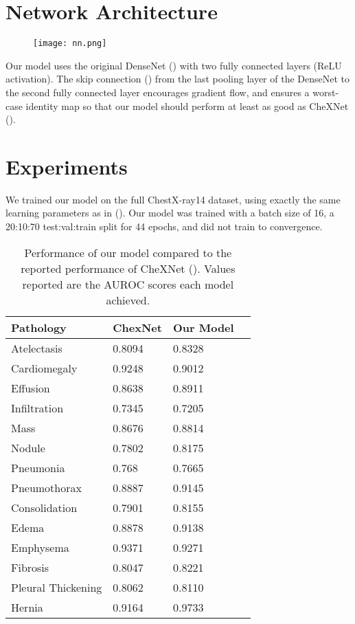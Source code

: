 \documentclass{article}
\begin{document}
\section{Network Architecture}
\label{Arch}
\begin{figure}[H]
  \centering
  \texttt{[image: nn.png]}
\end{figure}
Our model uses the original DenseNet (\citet{huang2017densely}) with two fully connected layers (ReLU activation). The skip connection (\citet{he2016deep}) from the last pooling layer of the DenseNet to the second fully connected layer encourages gradient flow, and ensures a worst-case identity map so that our model should perform at least as good as CheXNet (\citet{rajpurkar2017chexnet}).


\section{Experiments}
\label{Exp}

We trained our model on the full ChestX-ray14 dataset, using exactly the same learning parameters as in (\citet{rajpurkar2017chexnet}). Our model was trained with a batch size of 16, a 20:10:70 test:val:train split for 44 epochs, and did not train to convergence.

\begin{table}[H]
  \caption{Performance of our model compared to the reported performance of CheXNet (\citet{rajpurkar2017chexnet}). Values reported are the AUROC scores each model achieved.}
  \label{Comparison of our work against CheXNet}
  \centering
  \begin{tabular}{llll}
    \toprule
        Pathology &  ChexNet    & Our Model \\
    \midrule
    Atelectasis   & 0.8094 &  0.8328 \\
    Cardiomegaly   &    0.9248 &  0.9012 \\
    Effusion     &  0.8638 &  0.8911 \\
    Infiltration &  0.7345 &  0.7205 \\
    Mass    & 0.8676 &  0.8814 \\
    Nodule  & 0.7802 &  0.8175 \\
    Pneumonia & 0.768 & 0.7665 \\ 
    Pneumothorax &  0.8887 &  0.9145\\ 
    Consolidation & 0.7901 &  0.8155\\ 
    Edema   & 0.8878  & 0.9138\\
    Emphysema &   0.9371 &  0.9271 \\
    Fibrosis &  0.8047 &  0.8221 \\ 
    Pleural Thickening &  0.8062  & 0.8110 \\
    Hernia &  0.9164 &  0.9733\\
    \bottomrule
  \end{tabular}
\end{table}
\end{document}
